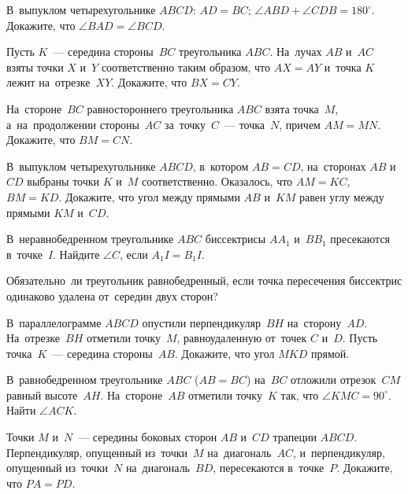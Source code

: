 


\begin{problems}

\item
В~выпуклом четырехугольнике $ABCD$:
$AD = BC$; $\angle ABD + \angle CDB = 180^{\circ}$.
Докажите, что $\angle BAD = \angle BCD$.

\item
Пусть $K$~--- середина стороны~$BC$ треугольника $ABC$.
На~лучах $AB$ и~$AC$ взяты точки $X$ и~$Y$ соответственно таким образом, что
$AX = AY$ и~точка $K$ лежит на~отрезке~$XY$.
Докажите, что $BX = CY$.

\item
На~стороне~$BC$ равностороннего треугольника $ABC$ взята точка~$M$,
а~на~продолжении стороны~$AC$ за~точку~$C$~--- точка~$N$, причем $AM = MN$.
Докажите, что $BM = CN$.

\item
В~выпуклом четырехугольнике $ABCD$, в~котором $AB = CD$, на~сторонах $AB$
и~$CD$ выбраны точки $K$ и~$M$ соответственно.
Оказалось, что $AM = KC$, $BM = KD$.
Докажите, что угол между прямыми $AB$ и~$KM$ равен углу между
прямыми $KM$ и~$CD$.

\item
В~неравнобедренном треугольнике $ABC$ биссектрисы $A A_1$ и~$B B_1$ пресекаются
в~точке~$I$.
Найдите $\angle C$, если $A_1 I = B_1 I$.

\item
Обязательно~ли треугольник равнобедренный, если точка пересечения биссектрис
одинаково удалена от~середин двух сторон?

\item
В~параллелограмме $ABCD$ опустили перпендикуляр~$BH$ на~сторону~$AD$.
На~отрезке~$BH$ отметили точку~$M$, равноудаленную от~точек $C$ и~$D$.
Пусть точка~$K$~--- середина стороны~$AB$.
Докажите, что угол $MKD$ прямой.

\item
В~равнобедренном треугольнике $ABC$ ($AB = BC$) на~$BC$ отложили отрезок~$CM$
равный высоте~$AH$.
На~стороне~$AB$ отметили точку~$K$ так, что $\angle KMC = 90^{\circ}$.
Найти $\angle ACK$.

\item
Точки $M$ и~$N$~--- середины боковых сторон $AB$ и~$CD$ трапеции $ABCD$.
Перпендикуляр, опущенный из~точки~$M$ на~диагональ~$AC$, и~перпендикуляр,
опущенный из~точки~$N$ на~диагональ~$BD$, пересекаются в~точке~$P$.
Докажите, что $PA = PD$.

\end{problems}

